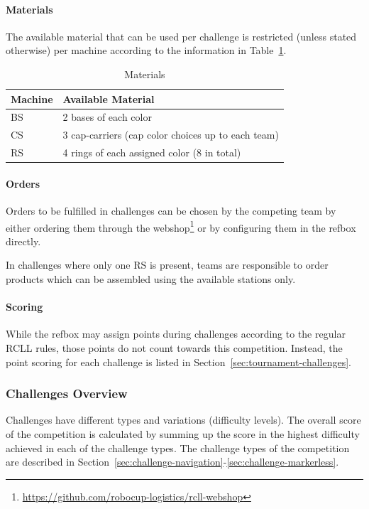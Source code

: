 \documentclass[12pt,twoside]{article}
\newcommand{\refsec}[1]{Section~\ref{#1}}
\newcommand{\reftab}[1]{Table~\ref{#1}}
\begin{document}

\paragraph{Materials}\label{sec:materials}
The available material that can be used per challenge is restricted
(unless stated otherwise) per machine according to the information in
\reftab{tab:materials}.
\begin{table}[!htb]
 \centering
  \begin{tabularx}{\linewidth}{l|l}
   Machine & Available Material  \\\hline
   \ac{BS} & 2 bases of each color \\
   \ac{CS} & 3 cap-carriers (cap color choices up to each team)  \\
   \ac{RS} & 4 rings of each assigned color (8 in total)  \\
  \end{tabularx}
 \caption{Materials}
 \label{tab:materials}
\end{table}

\paragraph{Orders}
Orders to be fulfilled in challenges can be chosen by the competing team
by either ordering them through the
webshop\footnote{\url{https://github.com/robocup-logistics/rcll-webshop}}
or by configuring them in the \ac{refbox} directly.

In challenges where only one \ac{RS} is present, teams are responsible to
order products which can be assembled using the available stations only.

\paragraph{Scoring}\label{sec:scoring}
While the \ac{refbox} may assign points during challenges according to the
regular \ac{RCLL} rules, those points do not count towards this competition.
Instead, the point scoring for each challenge is listed in
\refsec{sec:tournament-challenges}.

\subsubsection{Challenges Overview}
\label{sec:challenges}
Challenges have different types and variations (difficulty levels).
The overall score of the competition is calculated by summing up the score
in the highest difficulty achieved in each of the challenge types.
The challenge types of the competition are described in
\refsec{sec:challenge-navigation}-\ref{sec:challenge-markerless}.
\end{document}
